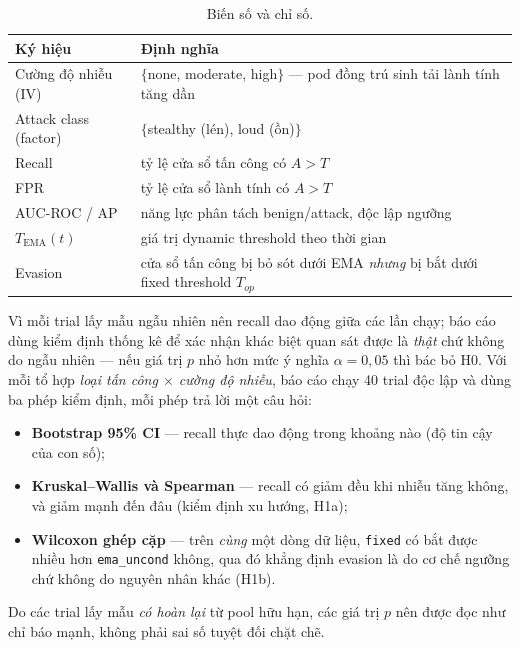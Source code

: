 \begin{table}[ht]
\caption{Biến số và chỉ số.}
\label{tab:metrics}
\centering
\begin{tabular}{@{}p{3.6cm}p{8.4cm}@{}}
\toprule
\textbf{Ký hiệu} & \textbf{Định nghĩa} \\
\midrule
Cường độ nhiễu (IV) & $\{$none, moderate, high$\}$ — pod đồng trú sinh tải lành tính tăng dần \\
Attack class (factor) & $\{$stealthy (lén), loud (ồn)$\}$ \\
Recall & tỷ lệ cửa sổ tấn công có $A>T$ \\
FPR & tỷ lệ cửa sổ lành tính có $A>T$ \\
AUC-ROC / AP & năng lực phân tách benign/attack, độc lập ngưỡng \\
$T_{\text{EMA}}(t)$ & giá trị dynamic threshold theo thời gian \\
Evasion & cửa sổ tấn công bị bỏ sót dưới EMA \textit{nhưng} bị bắt dưới fixed threshold $T_{op}$ \\
\bottomrule
\end{tabular}
\end{table}

Vì mỗi trial lấy mẫu ngẫu nhiên nên recall dao động giữa các lần chạy; báo cáo dùng kiểm định thống kê để xác nhận khác biệt quan sát được là \textit{thật} chứ không do ngẫu nhiên — nếu giá trị $p$ nhỏ hơn mức ý nghĩa $\alpha=0{,}05$ thì bác bỏ H0. Với mỗi tổ hợp \textit{loại tấn công $\times$ cường độ nhiễu}, báo cáo chạy 40 trial độc lập và dùng ba phép kiểm định, mỗi phép trả lời một câu hỏi:
\begin{itemize}[leftmargin=1.2cm]
\item \textbf{Bootstrap 95\% CI} — recall thực dao động trong khoảng nào (độ tin cậy của con số);
\item \textbf{Kruskal--Wallis và Spearman} — recall có giảm đều khi nhiễu tăng không, và giảm mạnh đến đâu (kiểm định xu hướng, H1a);
\item \textbf{Wilcoxon ghép cặp} — trên \textit{cùng} một dòng dữ liệu, \texttt{fixed} có bắt được nhiều hơn \texttt{ema\_uncond} không, qua đó khẳng định evasion là do cơ chế ngưỡng chứ không do nguyên nhân khác (H1b).
\end{itemize}
Do các trial lấy mẫu \textit{có hoàn lại} từ pool hữu hạn, các giá trị $p$ nên được đọc như chỉ báo mạnh, không phải sai số tuyệt đối chặt chẽ.

